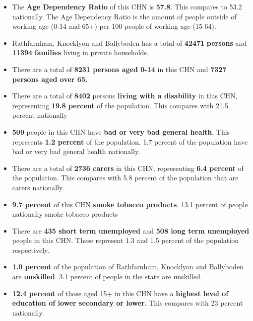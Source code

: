 \documentclass{article}
\begin{document}
\begin{itemize}

\item The \textbf{Age Dependency Ratio} of this CHN is  \textbf{57.8}. This compares to 53.2 nationally. The Age Dependency Ratio is the amount of people outside of working age (0-14 and 65+) per 100 people of working age (15-64). 

\item Rathfarnham, Knocklyon and Ballyboden has a total of \textbf{\num{42471}} \textbf{persons} and  \textbf{\num{11394}} \textbf{families} living in private households.

\item There are a total of \textbf{\num{8231} persons aged 0-14} in this CHN and \textbf{\num{7327} persons aged over 65.} 

\item There are a total of \textbf{\num{8402}} persons \textbf{living with a disability} in this CHN, representing \textbf{19.8 percent} of the population. This compares with  21.5 percent nationally

\item \textbf{\num{509}} people in this CHN have \textbf{bad or very bad general health}. This represents \textbf{1.2 percent} of the population. 1.7 percent of the population have bad or very bad general health nationally. 

\item There are a total of \textbf{\num{2736} carers} in this CHN, representing \textbf{6.4 percent} of the population. This compares with 5.8 percent of the population that are carers nationally. 

\item \textbf{9.7 percent} of this CHN \textbf{smoke tobacco products}. 13.1 percent of people nationally smoke tobacco products

\item There are \textbf{\num{435} short term unemployed} and \textbf{\num{508} long term unemployed} people in this CHN. These represent 1.3 and 1.5 percent of the population respectively.

\item  \textbf{1.0 percent} of the population of Rathfarnham, Knocklyon and Ballyboden are \textbf{unskilled}. 3.1 percent of people in the state are unskilled.

\item \textbf{12.4 percent} of those aged 15+ in this CHN have a \textbf{highest level of education of lower secondary or lower}. This compares with 23 percent nationally. 


\end{itemize}
\end{document}
